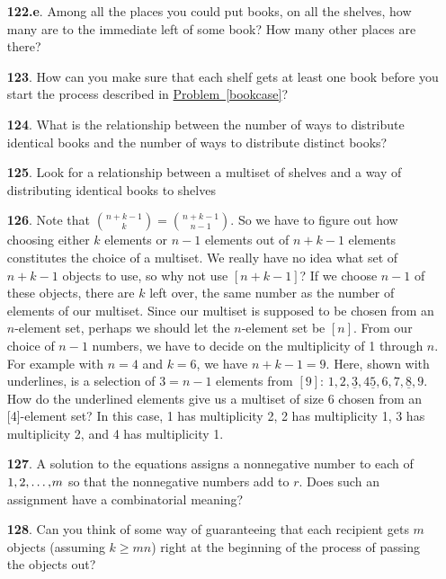\documentclass[10pt,]{book}
\theoremstyle{plain}
\theoremstyle{definition}
\theoremstyle{definition}
\numberwithin{equation}{chapter}
\begin{document}
\begin{itemize}[itemsep=1em]
\item[\textbf{122.e}.]\hypertarget{p-746}{}%
Among all the places you could put books, on all the shelves, how many are to the immediate left of some book? How many other places are there?%

\item[\textbf{123}.]\hypertarget{p-751}{}%
How can you make sure that each shelf gets at least one book before you start the process described in \hyperref[bookcase]{Problem~\ref{bookcase}}?%

\item[\textbf{124}.]\hypertarget{p-758}{}%
What is the relationship between the number of ways to distribute identical books and the number of ways to distribute distinct books?%

\item[\textbf{125}.]\hypertarget{p-761}{}%
Look for a relationship between a multiset of shelves and a way of distributing identical books to shelves%

\item[\textbf{126}.]\hypertarget{p-764}{}%
Note that \(\binom{n+k-1}{k} = \binom{n+k-1}{n-1}\). So we have to figure out how choosing either \(k\) elements or \(n - 1\) elements out of \(n + k - 1\) elements constitutes the choice of a multiset. We really have no idea what set of \(n + k - 1\) objects to use, so why not use \([n + k - 1]\)? If we choose \(n - 1\) of these objects, there are \(k\) left over, the same number as the number of elements of our multiset. Since our multiset is supposed to be chosen from an \(n\)-element set, perhaps we should let the \(n\)-element set be \([n]\). From our choice of \(n - 1\) numbers, we have to decide on the multiplicity of 1 through \(n\). For example with \(n = 4\) and \(k = 6\), we have \(n+k-1=9\). Here, shown with underlines, is a selection of \(3=n-1\) elements from \([9]\): \(1, 2, \underline{3}, 4 \underline{5}, 6, 7, \underline{8}, 9\). How do the underlined elements give us a multiset of size 6 chosen from an [4]-element set? In this case, 1 has multiplicity 2, 2 has multiplicity 1, 3 has multiplicity 2, and 4 has multiplicity 1.%

\item[\textbf{127}.]\hypertarget{p-767}{}%
A solution to the equations assigns a nonnegative number to each of \(1,2,\ldots,\hspace{-1.1pt} m\) so that the nonnegative numbers add to \(r\). Does such an assignment have a combinatorial meaning?%

\item[\textbf{128}.]\hypertarget{p-770}{}%
Can you think of some way of guaranteeing that each recipient gets \(m\) objects (assuming \(k \ge mn\)) right at the beginning of the process of passing the objects out?%


\end{itemize}
\end{document}

